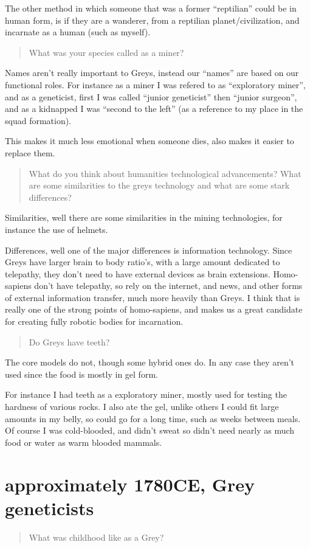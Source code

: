 The other method in which someone that was a former ``reptilian'' could be in
human form, is if they are a wanderer, from a reptilian planet/civilization, and
incarnate as a human (such as myself).

\blockquote{What was your species called as a miner?}

Names aren't really important to Greys, instead our ``names'' are based on our
functional roles. For instance as a miner I was refered to as ``exploratory
miner'', and as a geneticist, first I was called ``junior geneticist'' then 
``junior surgeon'', and as a kidnapped I was ``second to the left'' (as a
reference to my
place in the squad formation).

This makes it much less emotional when someone dies, also makes it easier to
replace them.

\blockquote{What do you think about humanities technological advancements? What
are some similarities to the greys technology and what are some stark
differences?}

Similarities, well there are some similarities in the mining technologies, for
instance the use of helmets.

Differences, well one of the major differences is information technology. Since
Greys have larger brain to body ratio's, with a large amount dedicated to
telepathy, they don't need to have external devices as brain extensions.
Homo-sapiens don't have telepathy, so rely on the internet, and news, and other
forms of external information transfer, much more heavily than Greys. I think
that is really one of the strong points of homo-sapiens, and makes us a great
candidate for creating fully robotic bodies for incarnation.

\blockquote{Do Greys have teeth?}

The core models do not, though some hybrid ones do. In any case they aren't used
since the food is mostly in gel form.

For instance I had teeth as a exploratory miner, mostly used for testing the 
hardness of various rocks. I also ate the gel, unlike others I could fit large
amounts in my belly, so could go for a long time, such as weeks between meals.
Of course I was cold-blooded, and didn't sweat so didn't need nearly as much 
food or water as warm blooded mammals. 

\chapter{approximately 1780CE, Grey geneticists}
\blockquote{What was childhood like as a Grey?}{}

